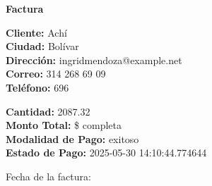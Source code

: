 \documentclass{article}
\begin{document}
\begin{center}
    {\LARGE \textbf{Factura}}\\[1cm]
\end{center}

\textbf{Cliente:} Achí \\
\textbf{Ciudad:} Bolívar \\
\textbf{Dirección:} ingridmendoza@example.net \\
\textbf{Correo:} 314 268 69 09 \\
\textbf{Teléfono:} 696 \\

\vspace{0.5cm}

\textbf{Cantidad:} 2087.32 \\
\textbf{Monto Total:} \$ completa \\
\textbf{Modalidad de Pago:} exitoso \\
\textbf{Estado de Pago:} 2025-05-30 14:10:44.774644 \\

\vspace{1cm}

Fecha de la factura: 
\end{document}
